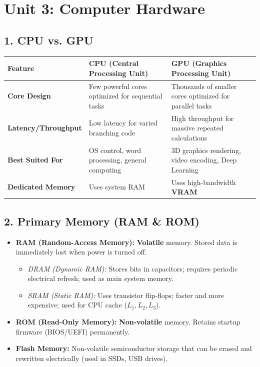 \documentclass[a4paper,11pt]{article}
\begin{document}
\newpage

\section{Unit 3: Computer Hardware}

\subsection{1. CPU vs. GPU}
\begin{center}
\small
\renewcommand{\arraystretch}{1.2}
\begin{tabular}{@{}l p{6.5cm} p{6.5cm}@{}}
\toprule
\textbf{Feature} & \textbf{CPU (Central Processing Unit)} & \textbf{GPU (Graphics Processing Unit)} \\
\midrule
\textbf{Core Design} & Few powerful cores optimized for sequential tasks & Thousands of smaller cores optimized for parallel tasks \\
\textbf{Latency/Throughput}& Low latency for varied branching code & High throughput for massive repeated calculations \\
\textbf{Best Suited For} & OS control, word processing, general computing & 3D graphics rendering, video encoding, Deep Learning \\
\textbf{Dedicated Memory}& Uses system RAM & Uses high-bandwidth \textbf{VRAM} \\
\bottomrule
\end{tabular}
\end{center}

\subsection{2. Primary Memory (RAM \& ROM)}
\begin{conceptbox}
\begin{itemize}[leftmargin=5mm]
    \item \textbf{RAM (Random-Access Memory):} \textbf{Volatile} memory. Stored data is immediately lost when power is turned off.
    \begin{itemize}
        \item \textit{DRAM (Dynamic RAM):} Stores bits in capacitors; requires periodic electrical refresh; used as main system memory.
        \item \textit{SRAM (Static RAM):} Uses transistor flip-flops; faster and more expensive; used for CPU cache ($L_1, L_2, L_3$).
    \end{itemize}
    \item \textbf{ROM (Read-Only Memory):} \textbf{Non-volatile} memory. Retains startup firmware (BIOS/UEFI) permanently.
    \item \textbf{Flash Memory:} Non-volatile semiconductor storage that can be erased and rewritten electrically (used in SSDs, USB drives).
\end{itemize}
\end{conceptbox}
\end{document}
